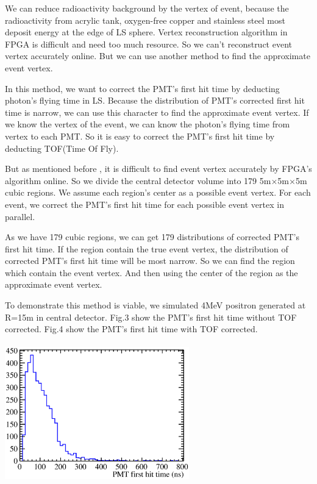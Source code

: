 \documentclass[a4paper,10pt,twoside]{paper}
\begin{document}
\begin{multicols}{2}
		We can reduce radioactivity background by the vertex of event, because the  radioactivity 
		from  acrylic tank, oxygen-free copper and stainless steel most deposit energy at the edge of
		LS sphere. Vertex reconstruction algorithm in FPGA is difficult and need too much resource.
		So we can't reconstruct event vertex accurately online. But we can use another method to find
		the approximate event vertex.

		In this method, we want to correct the PMT's first
		hit time by deducting photon's flying time in LS. 
		Because the distribution of PMT's corrected first hit time
		is narrow, we can use this character to find the approximate event vertex. 
		If we know the vertex of the event, we can know the photon's flying time from vertex to each
		PMT.
		So it is easy to correct the PMT's first hit time
		by deducting TOF(Time Of Fly).

		But as mentioned before , it is difficult to find event
		vertex accurately by FPGA's algorithm online. So we
		divide the central detector volume into 179 5m$\times$5m$\times$5m
		cubic regions. We assume each region's center as a possible event vertex.
		For each event, we correct the PMT's 
		first hit time for each possible event vertex in parallel.


		As we have 179 cubic regions, we can get 179 distributions of corrected 
		PMT's first hit time. 
		If the region contain the true event vertex, 
		the distribution of corrected PMT's first hit time 
		will be most narrow.
		So we can find the region which contain the event vertex. 
		And then using the center of the region as the approximate
		event vertex.

		To demonstrate this method is viable, we simulated 4MeV 
		positron generated at R=15m in central detector. 
		Fig.3 show the PMT's first hit time without TOF corrected.
		Fig.4 show the PMT's first hit time with TOF corrected.


		\begin{center}
			\includegraphics[width=8cm,height=6cm]{4MeV_e+_PMT_first_hitTime.eps}
		\end{center}



\end{multicols}
\end{document}
